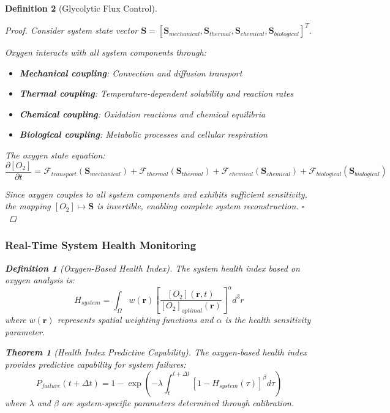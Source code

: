 \documentclass[12pt,a4paper]{article}
\newtheorem{theorem}{Theorem}
\newtheorem{definition}{Definition}
\begin{document}
\begin{definition}[Glycolytic Flux Control]
\begin{proof}
Consider system state vector $\mathbf{S} = [\mathbf{S}_{mechanical}, \mathbf{S}_{thermal}, \mathbf{S}_{chemical}, \mathbf{S}_{biological}]^T$. 

Oxygen interacts with all system components through:
\begin{itemize}
\item \textbf{Mechanical coupling}: Convection and diffusion transport
\item \textbf{Thermal coupling}: Temperature-dependent solubility and reaction rates
\item \textbf{Chemical coupling}: Oxidation reactions and chemical equilibria
\item \textbf{Biological coupling}: Metabolic processes and cellular respiration
\end{itemize}

The oxygen state equation:
\begin{equation}
\frac{\partial [O_2]}{\partial t} = \mathcal{F}_{transport}(\mathbf{S}_{mechanical}) + \mathcal{F}_{thermal}(\mathbf{S}_{thermal}) + \mathcal{F}_{chemical}(\mathbf{S}_{chemical}) + \mathcal{F}_{biological}(\mathbf{S}_{biological})
\end{equation}

Since oxygen couples to all system components and exhibits sufficient sensitivity, the mapping $[O_2] \mapsto \mathbf{S}$ is invertible, enabling complete system reconstruction. $\square$
\end{proof}

\subsubsection{Real-Time System Health Monitoring}

\begin{definition}[Oxygen-Based Health Index]
The system health index based on oxygen analysis is:
\begin{equation}
H_{system} = \int_{\Omega} w(\mathbf{r}) \left[ \frac{[O_2](\mathbf{r}, t)}{[O_2]_{optimal}(\mathbf{r})} \right]^{\alpha} d^3r
\end{equation}
where $w(\mathbf{r})$ represents spatial weighting functions and $\alpha$ is the health sensitivity parameter.
\end{definition}

\begin{theorem}[Health Index Predictive Capability]
The oxygen-based health index provides predictive capability for system failures:
\begin{equation}
P_{failure}(t + \Delta t) = 1 - \exp\left(-\lambda \int_t^{t+\Delta t} [1 - H_{system}(\tau)]^{\beta} d\tau\right)
\end{equation}
where $\lambda$ and $\beta$ are system-specific parameters determined through calibration.
\end{theorem}


\end{definition}
\end{document}
